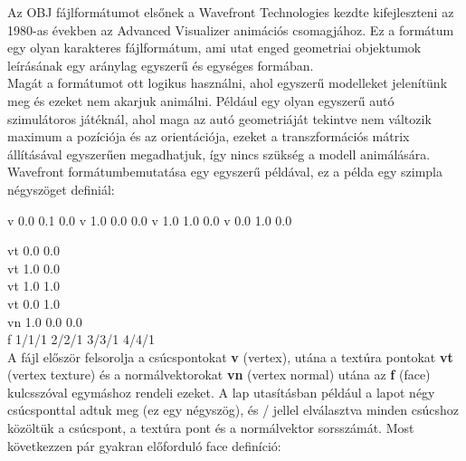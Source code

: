
Az OBJ fájlformátumot elsőnek a Wavefront Technologies kezdte kifejleszteni az 1980-as években az Advanced Visualizer animációs csomagjához. Ez a formátum egy olyan karakteres fájlformátum, ami utat enged geometriai objektumok leírásának egy aránylag egyszerű és egységes formában. \\
Magát a formátumot ott logikus használni, ahol egyszerű modelleket jelenítünk meg és ezeket nem akarjuk animálni. Például egy olyan egyszerű autó szimulátoros játéknál, ahol maga az autó geometriáját tekintve nem változik maximum a pozíciója és az orientációja, ezeket a transzformációs mátrix állításával egyszerűen megadhatjuk, így nincs szükség a modell animálására.\\
Wavefront formátumbemutatása egy egyszerű példával, ez a példa egy szimpla négyszöget definiál:\\

\begin{cpp} 
v 0.0 0.1 0.0
v 1.0 0.0 0.0
v 1.0 1.0 0.0
v 0.0 1.0 0.0
\end{cpp}

\noindent vt 0.0 0.0\\
vt 1.0 0.0\\
vt 1.0 1.0\\
vt 0.0 1.0\\

\noindent vn 1.0 0.0 0.0 \\

\noindent f 1/1/1 2/2/1 3/3/1 4/4/1\\

A fájl először felsorolja a csúcspontokat \textbf{v} (vertex), utána a textúra pontokat \textbf{vt} (vertex texture) és a normálvektorokat \textbf{vn} (vertex normal) utána  az \textbf{f} (face) kulcsszóval egymáshoz rendeli ezeket. A lap utasításban például a lapot négy csúcsponttal adtuk meg (ez egy négyszög), és / jellel elválasztva minden csúcshoz közöltük a csúcspont, a textúra pont és a normálvektor sorsszámát. Most következzen pár gyakran előforduló face definíció:\\

